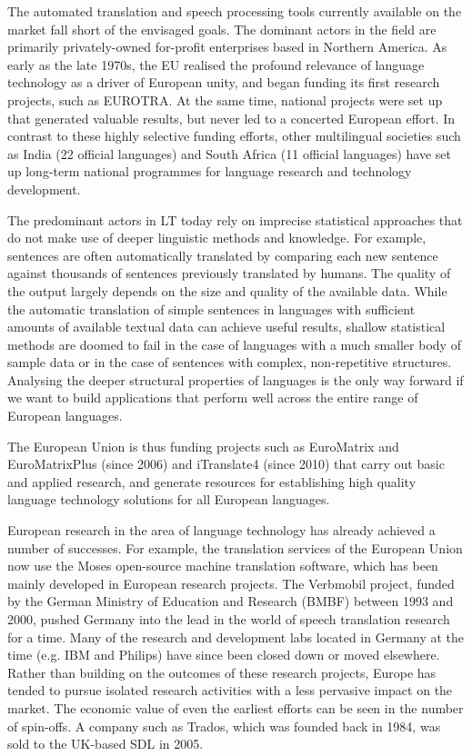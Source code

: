 \documentclass[]{../../metanetpaper}
\begin{document}
\begin{Parallel}[c]{79mm}{78mm}
{    

The automated translation and speech processing tools currently available on the market fall short of the envisaged goals. The dominant actors in the field are primarily privately-owned for-profit enterprises based in Northern America. As early as the late 1970s, the EU realised the profound relevance of language technology as a driver of European unity, and began funding its first research projects, such as EUROTRA. At the same time, national projects were set up that generated valuable results, but never led to a concerted European effort. In contrast to these highly selective funding efforts, other multilingual societies such as India (22 official languages) and South Africa (11 official languages) have set up long-term national programmes for language research and technology development. 

The predominant actors in LT today rely on imprecise statistical approaches that do not make use of deeper linguistic methods and knowledge. For example, sentences are often automatically translated by comparing each new sentence against thousands of sentences previously translated by humans. The quality of the output largely depends on the size and quality of the available  data. While the automatic translation of simple sentences in languages with sufficient amounts of available textual data can achieve useful results, shallow statistical methods are doomed to fail in the case of languages with a much smaller body of sample data or in the case of sentences with complex, non-repetitive structures. Analysing the deeper structural properties of languages is the only way forward if we want to build applications that perform well across the entire range of European languages.

The European Union is thus funding projects such as EuroMatrix and EuroMatrixPlus (since 2006) and iTranslate4 (since 2010) that carry out basic and applied research, and generate resources for establishing high quality language technology solutions for all European languages. 

European research in the area of language technology has already achieved a number of successes. For example, the translation services of the European Union now use the Moses open-source machine translation software, which has been mainly developed in European research projects. The Verbmobil project, funded by the German Ministry of Education and Research (BMBF) between 1993 and 2000, pushed Germany into the lead in the world of speech translation research for a time. Many of the research and development labs located in Germany at the time (e.g. IBM and Philips) have since been closed down or moved elsewhere. Rather than building on the outcomes of these research projects, Europe has tended to pursue isolated research activities with a less pervasive impact on the market. The economic value of even the earliest efforts can be seen in the number of spin-offs. A company such as Trados, which was founded back in 1984, was sold to the UK-based SDL in 2005.

}
\end{Parallel}
\end{document}
